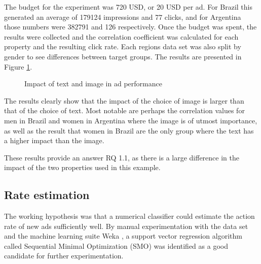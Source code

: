 \documentclass{sig-alternate}
\begin{document}
The budget for the experiment was 720 USD, or 20 USD per ad. For Brazil this generated an average of 179124 impressions and 77 clicks, and for Argentina those numbers were 382791 and 126 respectively. Once the budget was spent, the results were collected and the correlation coefficient was calculated for each property and the resulting click rate. Each regions data set was also split by gender to see differences between target groups. The results are presented in Figure \ref{fig:PropertyImpact}.

\begin{figure}[htbp]
\begin{center}

	\caption{Impact of text and image in ad performance}
	\label{fig:PropertyImpact}
\end{center}
\end{figure}

The results clearly show that the impact of the choice of image is larger than that of the choice of text. Most notable are perhaps the correlation values for men in Brazil and women in Argentina where the image is of utmost importance, as well as the result that women in Brazil are the only group where the text has a higher impact than the image.

These results provide an answer RQ 1.1, as there is a large difference in the impact of the two properties used in this example.

\subsection{Rate estimation}
The working hypothesis was that a numerical classifier could estimate the action rate of new ads sufficiently well. By manual experimentation with the data set and the machine learning suite Weka \citep{Garner1995}, a support vector regression algorithm called Sequential Minimal Optimization (SMO) was identified as a good candidate for further experimentation.
\end{document}
